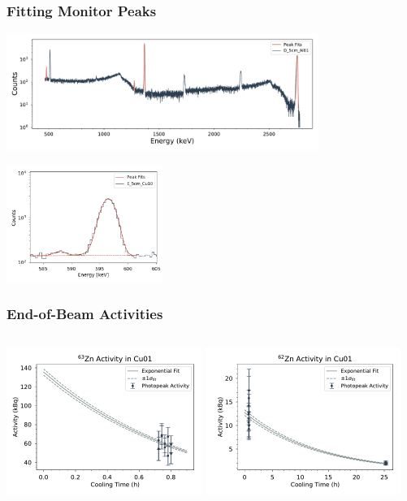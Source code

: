 \documentclass[12pt,xcolor=dvipsnames]{beamer}
\begin{document}
\begin{frame}
\frametitle{Fitting Monitor Peaks}
\centering
\includegraphics[width=4.0in]{peak_fits/D_5cm_Al01_fits}

\includegraphics[width=2.0in]{62ZN_Peak.png}

\end{frame}

\begin{frame}
\frametitle{End-of-Beam Activities}
\begin{columns}[c]
\column{2.5in}
\includegraphics[width=2.5in]{decay_curves/Cu01_63ZN}
\column{2.5in}
\includegraphics[width=2.5in]{decay_curves/Cu01_62ZN}
\end{columns}
\end{frame}
\end{document}
